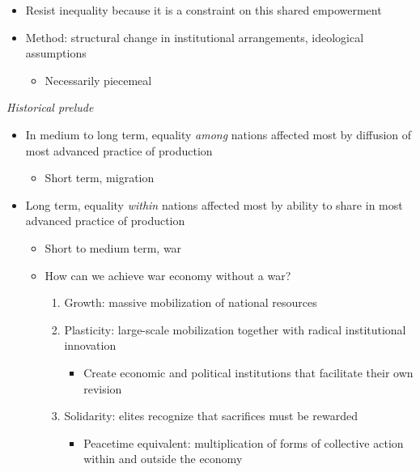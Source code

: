 \begin{itemize}
\begin{itemize}
    \begin{itemize}
    \tightlist
    \item
      Resist inequality because it is a constraint on this shared
      empowerment
    \item
      Method: structural change in institutional arrangements,
      ideological assumptions

      \begin{itemize}
      \tightlist
      \item
        Necessarily piecemeal
      \end{itemize}
    \end{itemize}
  \end{itemize}
\end{itemize}

\emph{Historical prelude}

\begin{itemize}
\tightlist
\item
  In medium to long term, equality \emph{among} nations affected most by
  diffusion of most advanced practice of production

  \begin{itemize}
  \tightlist
  \item
    Short term, migration
  \end{itemize}
\item
  Long term, equality \emph{within} nations affected most by ability to
  share in most advanced practice of production

  \begin{itemize}
  \tightlist
  \item
    Short to medium term, war
  \item
    How can we achieve war economy without a war?

    \begin{enumerate}
    \def\labelenumi{\arabic{enumi}.}
    \tightlist
    \item
      Growth: massive mobilization of national resources
    \item
      Plasticity: large-scale mobilization together with radical
      institutional innovation

      \begin{itemize}
      \tightlist
      \item
        Create economic and political institutions that facilitate their
        own revision
      \end{itemize}
    \item
      Solidarity: elites recognize that sacrifices must be rewarded

      \begin{itemize}
      \tightlist
      \item
        Peacetime equivalent: multiplication of forms of collective
        action within and outside the economy
      \end{itemize}
    \end{enumerate}
  \end{itemize}
\end{itemize}

